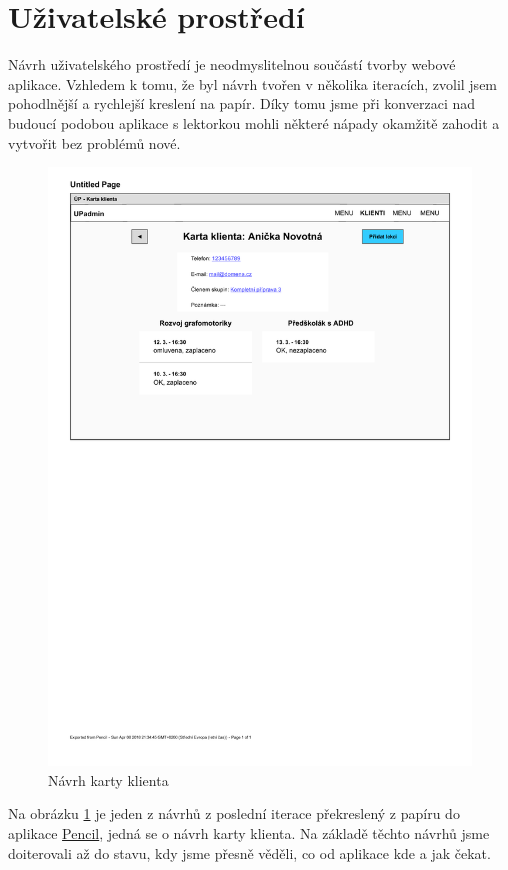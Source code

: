     \section{Uživatelské prostředí}
    Návrh uživatelského prostředí je neodmyslitelnou součástí tvorby webové aplikace. Vzhledem k tomu, že byl návrh tvořen v několika iteracích, zvolil jsem pohodlnější a rychlejší kreslení na papír. Díky tomu jsme při konverzaci nad budoucí podobou aplikace s lektorkou mohli některé nápady okamžitě zahodit a vytvořit bez problémů nové.
    
    \begin{figure}[ht]\centering
    	\includegraphics[width=1\textwidth]{img/ui-navrh}
    	\caption[Návrh karty klienta]{Návrh karty klienta}\label{fig:ui-navrh}
    \end{figure}
    
    Na obrázku \ref{fig:ui-navrh} je jeden z návrhů z poslední iterace překreslený z papíru do aplikace \href{https://pencil.evolus.vn/}{Pencil}, jedná se o návrh karty klienta. Na základě těchto návrhů jsme doiterovali až do stavu, kdy jsme přesně věděli, co od aplikace kde a jak čekat.
    
